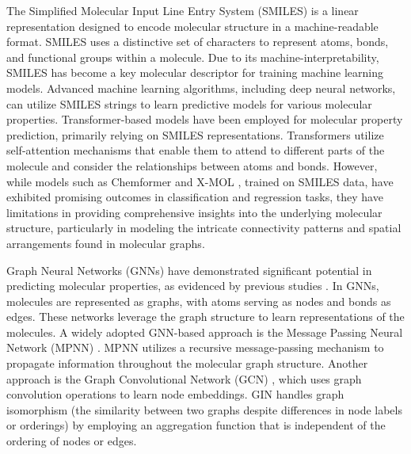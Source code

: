 \documentclass[sigconf,nonacm]{acmart}
\begin{document}
The Simplified Molecular Input Line Entry System (SMILES)  \cite{doi:10.1021/ci00057a005} is a linear representation designed to encode molecular structure in a machine-readable format. SMILES uses a distinctive set of characters to represent atoms, bonds, and functional groups within a molecule. Due to its machine-interpretability, SMILES has become a key molecular descriptor for training machine learning models. Advanced machine learning algorithms, including deep neural networks, can utilize SMILES strings to learn predictive models for various molecular properties. 
Transformer-based models \cite{10.1145/3307339.3342186,mgbert,DBLP:journals/corr/abs-2010-09885} have been employed for molecular property prediction, primarily relying on SMILES representations. Transformers utilize self-attention mechanisms that enable them to attend to different parts of the molecule and consider the relationships between atoms and bonds. However, while models such as Chemformer \cite{Irwin_2022} and X-MOL \cite{Xue2020.12.23.424259}, trained on SMILES data, have exhibited promising outcomes in classification and regression tasks, they have limitations in providing comprehensive insights into the underlying molecular structure, particularly in modeling the intricate connectivity patterns and spatial arrangements found in molecular graphs.















Graph Neural Networks (GNNs) have demonstrated significant potential in predicting molecular properties, as evidenced by previous studies \cite{pmlr-v70-gilmer17a,kipf2017semisupervised,DBLP:conf/iclr/XuHLJ19}. In GNNs, molecules are represented as graphs, with atoms serving as nodes and bonds as edges. These networks leverage the graph structure to learn representations of the molecules.
A widely adopted GNN-based approach is the Message Passing Neural Network (MPNN) \cite{pmlr-v70-gilmer17a}. MPNN utilizes a recursive message-passing mechanism to propagate information throughout the molecular graph structure. Another approach is the Graph Convolutional Network (GCN) \cite{DBLP:conf/iclr/KipfW17}, which uses graph convolution operations to learn node embeddings. 
GIN \cite{DBLP:conf/iclr/XuHLJ19} handles graph isomorphism (the similarity between two graphs despite differences in node labels or orderings) by employing an aggregation function that is independent of the ordering of nodes or edges. 
\end{document}
